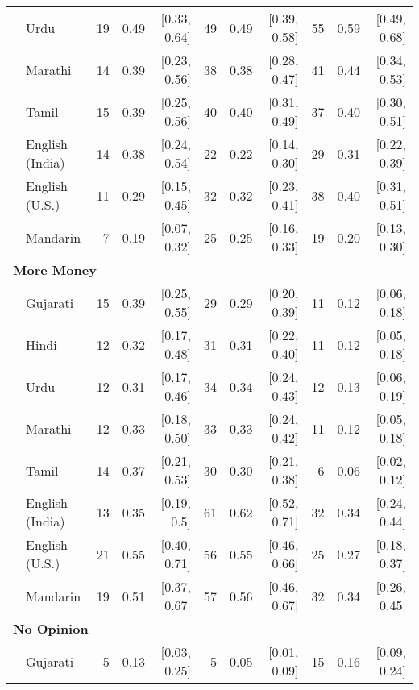 \begin{table}[H]
\begin{footnotesize}
\begin{tabular}{p{.1in}lrrrrrrrrr}
 & Urdu & 19 & 0.49 & [0.33, 0.64] & 49 & 0.49 & [0.39, 0.58] & 55 & 0.59 & [0.49, 0.68]\\

 & Marathi & 14 & 0.39 & [0.23, 0.56] & 38 & 0.38 & [0.28, 0.47] & 41 & 0.44 & [0.34, 0.53]\\

 & Tamil & 15 & 0.39 & [0.25, 0.56] & 40 & 0.40 & [0.31, 0.49] & 37 & 0.40 & [0.30, 0.51]\\

 & English (India) & 14 & 0.38 & [0.24, 0.54] & 22 & 0.22 & [0.14, 0.30] & 29 & 0.31 & [0.22, 0.39]\\

 & English (U.S.) & 11 & 0.29 & [0.15, 0.45] & 32 & 0.32 & [0.23, 0.41] & 38 & 0.40 & [0.31, 0.51]\\

& Mandarin & 7 & 0.19 & [0.07, 0.32] & 25 & 0.25 & [0.16, 0.33] & 19 & 0.20 & [0.13, 0.30]\\
\midrule
\multicolumn{11}{l}{\textbf{More Money}}\\
 & Gujarati & 15 & 0.39 & [0.25, 0.55] & 29 & 0.29 & [0.20, 0.39] & 11 & 0.12 & [0.06, 0.18]\\

 & Hindi & 12 & 0.32 & [0.17, 0.48] & 31 & 0.31 & [0.22, 0.40] & 11 & 0.12 & [0.05, 0.18]\\

 & Urdu & 12 & 0.31 & [0.17, 0.46] & 34 & 0.34 & [0.24, 0.43] & 12 & 0.13 & [0.06, 0.19]\\

 & Marathi & 12 & 0.33 & [0.18, 0.50] & 33 & 0.33 & [0.24, 0.42] & 11 & 0.12 & [0.05, 0.18]\\

 & Tamil & 14 & 0.37 & [0.21, 0.53] & 30 & 0.30 & [0.21, 0.38] & 6 & 0.06 & [0.02, 0.12]\\

 & English (India) & 13 & 0.35 & [0.19, 0.5] & 61 & 0.62 & [0.52, 0.71] & 32 & 0.34 & [0.24, 0.44]\\

 & English (U.S.) & 21 & 0.55 & [0.40, 0.71] & 56 & 0.55 & [0.46, 0.66] & 25 & 0.27 & [0.18, 0.37]\\

 & Mandarin & 19 & 0.51 & [0.37, 0.67] & 57 & 0.56 & [0.46, 0.67] & 32 & 0.34 & [0.26, 0.45]\\
\midrule
\multicolumn{11}{l}{\textbf{No Opinion}}\\
 & Gujarati & 5 & 0.13 & [0.03, 0.25] & 5 & 0.05 & [0.01, 0.09] & 15 & 0.16 & [0.09, 0.24]\\


\end{tabular}
\end{footnotesize}
\end{table}
